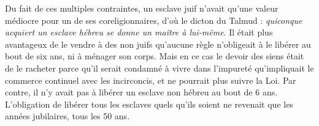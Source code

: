  Du fait de ces multiples contraintes, un esclave juif n'avait qu'une valeur médiocre pour un de ses coreligionnaires, d'où le dicton du Talmud : {\emph{quiconque acquiert un esclave hébreu se donne un maître à lui-même}}. Il était plus avantageux de le vendre à des non juifs qu'aucune règle n'obligeait à le libérer au bout de six ans, ni à ménager son corps. Mais en ce cas le devoir des siens était de le racheter parce qu'il serait condamné à vivre dans l'impureté qu'impliquait le commerce continuel avec les incirconcis, et ne pourrait plus suivre la Loi. Par contre, il n'y avait pas à libérer un esclave non hébreu au bout de 6 ans. L'obligation de libérer tous les esclaves quels qu'ils soient ne revenait que les années jubilaires, tous les 50 ans.

